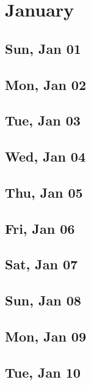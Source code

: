 \chapter{January}
	\section{Sun, Jan 01}
		
	\section{Mon, Jan 02}
		
	\section{Tue, Jan 03}
		
	\section{Wed, Jan 04}
		
	\section{Thu, Jan 05}
		
	\section{Fri, Jan 06}
		
	\section{Sat, Jan 07}
		
	\section{Sun, Jan 08}
		
	\section{Mon, Jan 09}
		
	\section{Tue, Jan 10}
		
